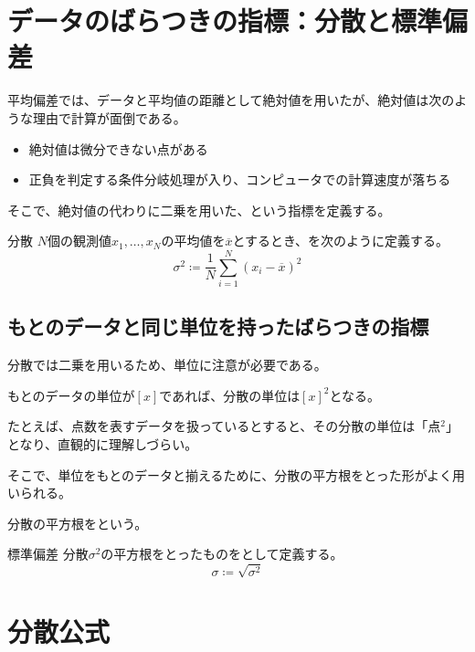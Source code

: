 \documentclass[../../../topic_statistics]{subfiles}
\begin{document}
\sectionline
\section{データのばらつきの指標：分散と標準偏差}

平均偏差では、データと平均値の距離として絶対値を用いたが、絶対値は次のような理由で計算が面倒である。
\begin{itemize}
  \item 絶対値は微分できない点がある
  \item 正負を判定する条件分岐処理が入り、コンピュータでの計算速度が落ちる
\end{itemize}

そこで、絶対値の代わりに二乗を用いた、という指標を定義する。

\begin{definition}{分散}
  $N$個の観測値$x_1, \ldots, x_N$の平均値を$\overline{x}$とするとき、を次のように定義する。
  \begin{equation*}
    \sigma^2 \coloneq \frac{1}{N} \sum_{i=1}^{N} (x_i - \overline{x})^2
  \end{equation*}
\end{definition}

\subsection{もとのデータと同じ単位を持ったばらつきの指標}

分散では二乗を用いるため、単位に注意が必要である。

もとのデータの単位が$[x]$であれば、分散の単位は$[x]^2$となる。

たとえば、点数を表すデータを扱っているとすると、その分散の単位は「点$^2$」となり、直観的に理解しづらい。

\br

そこで、単位をもとのデータと揃えるために、分散の平方根をとった形がよく用いられる。

分散の平方根をという。

\begin{definition}{標準偏差}
  分散$\sigma^2$の平方根をとったものをとして定義する。
  \begin{equation*}
    \sigma \coloneq \sqrt{\sigma^2}
  \end{equation*}
\end{definition}

\sectionline
\section{分散公式}
\end{document}
